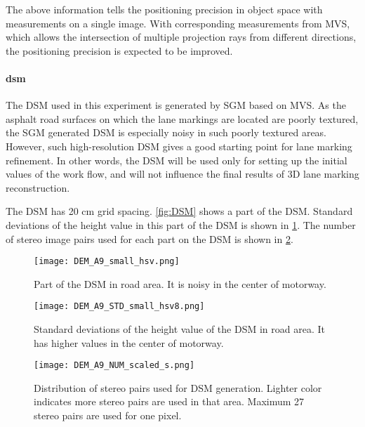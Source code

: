The above information tells the positioning precision in object space with measurements on a single image. With corresponding measurements from MVS, which allows the intersection of multiple projection rays from different directions, the positioning precision is expected to be improved.%



\paragraph{\gls{dsm}}
The DSM used in this experiment is generated by SGM based on MVS. As the asphalt road surfaces on which the lane markings are located are poorly textured, the SGM generated DSM is especially noisy in such poorly textured areas. However, such high-resolution DSM gives a good starting point for lane marking refinement. In other words, the DSM will be used only for setting up the initial values of the work flow, and will not influence the final results of 3D lane marking reconstruction.

The DSM has 20 cm grid spacing. \cref{fig:DSM} shows a part of the DSM. Standard deviations of the height value in this part of the DSM is shown in \cref{fig:DSMstd}. The number of stereo image pairs used for each part on the DSM is shown in \cref{fig:DSMnumber}.

\begin{figure}%
  \centering
  \texttt{[image: DEM\_A9\_small\_hsv.png]}
  \caption{\small Part of the DSM in road area. It is noisy in the center of motorway.}
  \label{fig:DSM}
  \vspace{0.5cm}
  \texttt{[image: DEM\_A9\_STD\_small\_hsv8.png]}
  \caption{\small Standard deviations of the height value of the DSM in road area. It has higher values in the center of motorway.}
  \label{fig:DSMstd}

\end{figure}

\begin{figure}%
  \centering
  \texttt{[image: DEM\_A9\_NUM\_scaled\_s.png]}
  \caption{\small Distribution of stereo pairs used for DSM generation. Lighter color indicates more stereo pairs are used in that area. Maximum 27 stereo pairs are used for one pixel.}%
  \label{fig:DSMnumber}
\end{figure}


